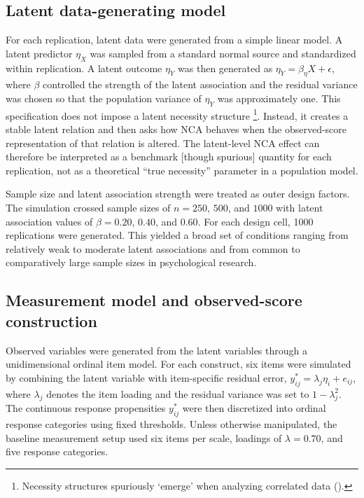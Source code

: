 \documentclass[
  man,
  longtable,
  nolmodern,
  notxfonts,
  notimes,
  colorlinks=true,linkcolor=blue,citecolor=blue,urlcolor=blue]{apa7}
\begin{document}
\subsection{Latent data-generating
model}\label{latent-data-generating-model}

For each replication, latent data were generated from a simple linear
model. A latent predictor \(\eta_X\) was sampled from a standard normal
source and standardized within replication. A latent outcome \(\eta_Y\)
was then generated as \(\eta_Y = \beta_\eta X + \epsilon\), where
\(\beta\) controlled the strength of the latent association and the
residual variance was chosen so that the population variance of
\(\eta_Y\) was approximately one. This specification does not impose a
latent necessity structure \footnote{Necessity structures spuriously
  `emerge' when analyzing correlated data
  ().}. Instead, it creates a stable latent relation and then
asks how NCA behaves when the observed-score representation of that
relation is altered. The latent-level NCA effect can therefore be
interpreted as a benchmark {[}though spurious{]} quantity for each
replication, not as a theoretical ``true necessity'' parameter in a
population model.

Sample size and latent association strength were treated as outer design
factors. The simulation crossed sample sizes of \(n = 250\), \(500\),
and \(1000\) with latent association values of \(\beta = 0.20\),
\(0.40\), and \(0.60\). For each design cell, 1000 replications were
generated. This yielded a broad set of conditions ranging from
relatively weak to moderate latent associations and from common to
comparatively large sample sizes in psychological research.

\subsection{Measurement model and observed-score
construction}\label{measurement-model-and-observed-score-construction}

Observed variables were generated from the latent variables through a
unidimensional ordinal item model. For each construct, six items were
simulated by combining the latent variable with item-specific residual
error, \(y^*_{ij} = \lambda_j \eta_i + e_{ij}\), where \(\lambda_j\)
denotes the item loading and the residual variance was set to
\(1-\lambda_j^2\). The continuous response propensities \(y^*_{ij}\)
were then discretized into ordinal response categories using fixed
thresholds. Unless otherwise manipulated, the baseline measurement setup
used six items per scale, loadings of \(\lambda = 0.70\), and five
response categories.
\end{document}

